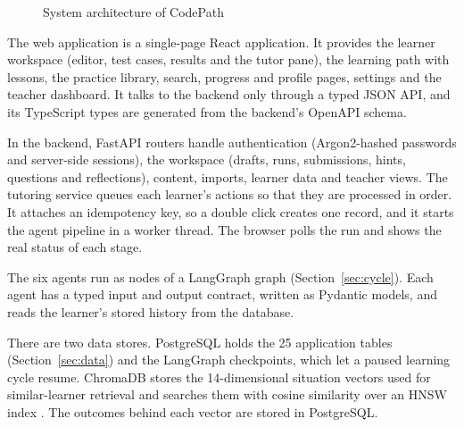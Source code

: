 \begin{figure}[htbp]
{}
\caption{System architecture of CodePath}\label{fig:architecture}
\end{figure}

The web application is a single-page React application. It provides the learner workspace (editor, test cases, results and the tutor pane), the learning path with lessons, the practice library, search, progress and profile pages, settings and the teacher dashboard. It talks to the backend only through a typed JSON API, and its TypeScript types are generated from the backend's OpenAPI schema.

In the backend, FastAPI routers handle authentication (Argon2-hashed passwords and server-side sessions), the workspace (drafts, runs, submissions, hints, questions and reflections), content, imports, learner data and teacher views. The tutoring service queues each learner's actions so that they are processed in order. It attaches an idempotency key, so a double click creates one record, and it starts the agent pipeline in a worker thread. The browser polls the run and shows the real status of each stage.

The six agents run as nodes of a LangGraph graph (Section~\ref{sec:cycle}). Each agent has a typed input and output contract, written as Pydantic models, and reads the learner's stored history from the database.

There are two data stores. PostgreSQL holds the 25 application tables (Section~\ref{sec:data}) and the LangGraph checkpoints, which let a paused learning cycle resume. ChromaDB stores the 14-dimensional situation vectors used for similar-learner retrieval and searches them with cosine similarity over an HNSW index \cite{chroma,malkov2020}. The outcomes behind each vector are stored in PostgreSQL.

